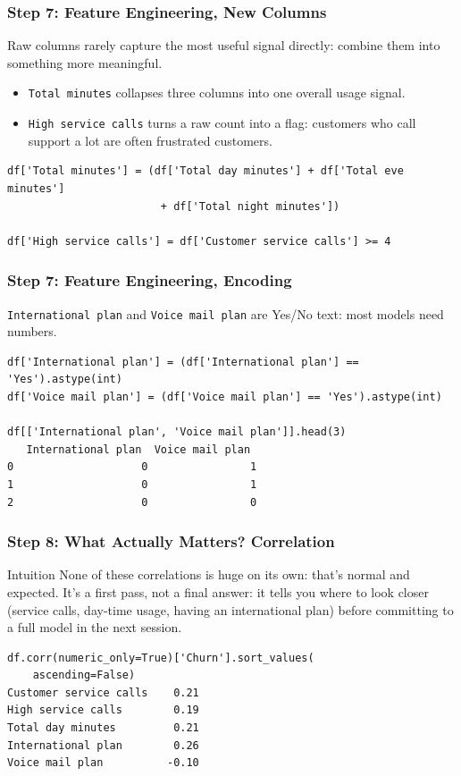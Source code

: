 \begin{frame}[fragile]\frametitle{Step 7: Feature Engineering, New Columns}
Raw columns rarely capture the most useful signal directly: combine them into something
more meaningful.
\begin{itemize}
\item \texttt{Total minutes} collapses three columns into one overall usage signal.
\item \texttt{High service calls} turns a raw count into a flag: customers who call
  support a lot are often frustrated customers.
\end{itemize}
\begin{lstlisting}
df['Total minutes'] = (df['Total day minutes'] + df['Total eve minutes']
                        + df['Total night minutes'])

df['High service calls'] = df['Customer service calls'] >= 4
\end{lstlisting}
\end{frame}

\begin{frame}[fragile]\frametitle{Step 7: Feature Engineering, Encoding}
\texttt{International plan} and \texttt{Voice mail plan} are Yes/No text: most models need
numbers.
\begin{lstlisting}
df['International plan'] = (df['International plan'] == 'Yes').astype(int)
df['Voice mail plan'] = (df['Voice mail plan'] == 'Yes').astype(int)

df[['International plan', 'Voice mail plan']].head(3)
   International plan  Voice mail plan
0                    0                1
1                    0                1
2                    0                0
\end{lstlisting}
\end{frame}

\begin{frame}[fragile]\frametitle{Step 8: What Actually Matters? Correlation}
\begin{block}{Intuition}
None of these correlations is huge on its own: that's normal and expected. It's a first
pass, not a final answer: it tells you where to look closer (service calls, day-time usage,
having an international plan) before committing to a full model in the next session.
\end{block}
\begin{lstlisting}
df.corr(numeric_only=True)['Churn'].sort_values(
    ascending=False)
Customer service calls    0.21
High service calls        0.19
Total day minutes         0.21
International plan        0.26
Voice mail plan          -0.10
\end{lstlisting}
\end{frame}

